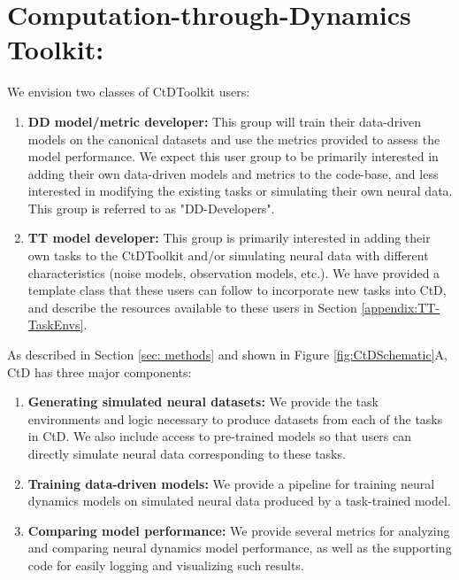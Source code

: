 \documentclass{article}
\begin{document}
\section{Computation-through-Dynamics Toolkit:}
We envision two classes of CtDToolkit users:
\begin{enumerate}
    \item \textbf{DD model/metric developer:} This group will train their data-driven models on the canonical datasets and use the metrics provided to assess the model performance. We expect this user group to be primarily interested in adding their own data-driven models and metrics to the code-base, and less interested in modifying the existing tasks or simulating their own neural data. This group is referred to as "DD-Developers".
    \item \textbf{TT model developer:} This group is primarily interested in adding their own tasks to the CtDToolkit and/or simulating neural data with different characteristics (noise models, observation models, etc.). We have provided a template class that these users can follow to incorporate new tasks into CtD, and describe the resources available to these users in Section \ref{appendix:TT-TaskEnvs}.
\end{enumerate}


As described in Section \ref{sec: methods} and shown in Figure \ref{fig:CtDSchematic}A, CtD has three major components:
\begin{enumerate}
    \item \textbf{Generating simulated neural datasets:} We provide the task environments and logic necessary to produce datasets from each of the tasks in CtD. We also include access to pre-trained models so that users can directly simulate neural data corresponding to these tasks.
    \item \textbf{Training data-driven models:} We provide a pipeline for training neural dynamics models on simulated neural data produced by a task-trained model.
    \item \textbf{Comparing model performance:} We provide several metrics for analyzing and comparing neural dynamics model performance, as well as the supporting code for easily logging and visualizing such results.
\end{enumerate}
\end{document}
